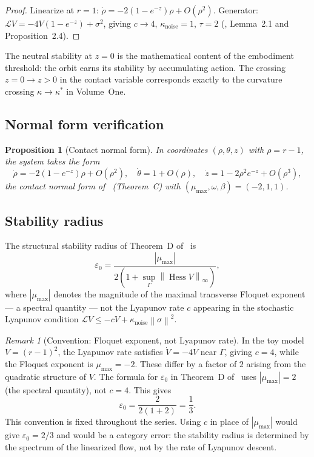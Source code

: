 \documentclass[12pt]{article}
\numberwithin{equation}{section}
\newtheorem{proposition}[theorem]{Proposition}
\theoremstyle{remark}
\newtheorem{remark}{Remark}[section]
\newcommand{\Orb}{\Gamma}
\newcommand{\cL}{\mathcal{L}}
\newcommand{\norm}[1]{\left\|#1\right\|}
\newcommand{\abs}[1]{\left|#1\right|}
\DeclareMathOperator{\Hess}{Hess}
\begin{document}
\begin{proof}
Linearize at $r=1$: $\dot\rho=-2(1-e^{-z})\rho+O(\rho^2)$.
Generator: $\cL V=-4V(1-e^{-z})+\sigma^2$, giving $c\to 4$,
$\kappa_{\mathrm{noise}}=1$, $\tau=2$
(\cite{Paper2}, Lemma~2.1 and Proposition~2.4).
\end{proof}

The neutral stability at $z=0$ is the mathematical content of
the embodiment threshold: the orbit earns its stability by
accumulating action. The crossing $z=0\to z>0$ in the contact
variable corresponds exactly to the curvature crossing
$\kappa\to\kappa^*$ in Volume~One.

\subsection{Normal form verification}

\begin{proposition}[Contact normal form]
\label{prop:nf}
In coordinates $(\rho,\theta,z)$ with $\rho=r-1$, the system
takes the form
\[
  \dot\rho=-2(1-e^{-z})\rho+O(\rho^2),\quad
  \dot\theta=1+O(\rho),\quad
  \dot z=1-2\rho^2 e^{-z}+O(\rho^3),
\]
the contact normal form of~\cite{Paper1} (Theorem~C) with
$(\mu_{\max},\omega,\beta)=(-2,1,1)$.
\end{proposition}

\subsection{Stability radius}

The structural stability radius of Theorem~D of~\cite{Paper1} is
\[
  \varepsilon_0
  = \frac{\abs{\mu_{\max}}}{2(1+\sup_\Orb\norm{\Hess V}_\infty)},
\]
where $\abs{\mu_{\max}}$ denotes the magnitude of the maximal
transverse Floquet exponent --- a spectral quantity --- not the
Lyapunov rate $c$ appearing in the stochastic Lyapunov condition
$\cL V \le -cV + \kappa_{\mathrm{noise}}\norm{\sigma}^2$.

\begin{remark}[Convention: Floquet exponent, not Lyapunov rate]
\label{rem:convention}
In the toy model $V=(r-1)^2$, the Lyapunov rate satisfies
$\dot V = -4V$ near $\Orb$, giving $c=4$, while the Floquet
exponent is $\mu_{\max}=-2$. These differ by a factor of $2$
arising from the quadratic structure of $V$. The formula for
$\varepsilon_0$ in Theorem~D of~\cite{Paper1} uses
$\abs{\mu_{\max}}=2$ (the spectral quantity), not $c=4$.
This gives
\[
  \varepsilon_0
  = \frac{2}{2(1+2)}
  = \frac{1}{3}.
\]
This convention is fixed throughout the series. Using $c$ in
place of $\abs{\mu_{\max}}$ would give $\varepsilon_0=2/3$ and
would be a category error: the stability radius is determined by
the spectrum of the linearized flow, not by the rate of Lyapunov
descent.
\end{remark}
\end{document}
